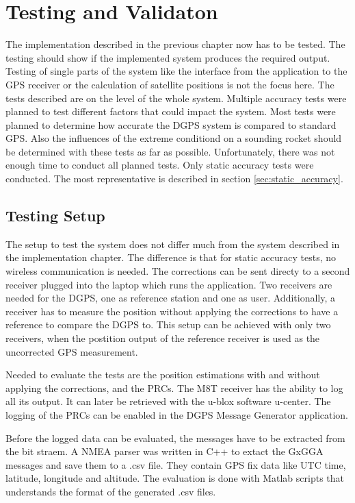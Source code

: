 \chapter{Testing and Validaton}

The implementation described in the previous chapter now has to be tested.
The testing should show if the implemented system produces the required output.
Testing of single parts of the system like the interface from the application to the GPS receiver or the calculation of satellite positions is not the focus here.
The tests described are on the level of the whole system.
Multiple accuracy tests were planned to test different factors that could impact the system.
Most tests were planned to determine how accurate the DGPS system is compared to standard GPS.
Also the influences of the extreme conditiond on a sounding rocket should be determined with these tests as far as possible.
Unfortunately, there was not enough time to conduct all planned tests.
Only static accuracy tests were conducted.
The most representative is described in section \ref{sec:static_accuracy}.


\section{Testing Setup}

The setup to test the system does not differ much from the system described in the implementation chapter.
The difference is that for static accuracy tests, no wireless communication is needed.
The corrections can be sent directy to a second receiver plugged into the laptop which runs the application.
Two receivers are needed for the DGPS, one as reference station and one as user.
Additionally, a receiver has to measure the position without applying the corrections to have a reference to compare the DGPS to.
This setup can be achieved with only two receivers, when the postition output of the reference receiver is used as the uncorrected GPS measurement.

Needed to evaluate the tests are the position estimations with and without applying the corrections, and the PRCs.
The M8T receiver has the ability to log all its output.
It can later be retrieved with the u-blox software u-center.
The logging of the PRCs can be enabled in the DGPS Message Generator application.

Before the logged data can be evaluated, the messages have to be extracted from the bit straem.
A NMEA parser was written in C++ to extact the GxGGA messages and save them to a .csv file.
They contain GPS fix data like UTC time, latitude, longitude and altitude.
The evaluation is done with Matlab scripts that understands the format of the generated .csv files.

